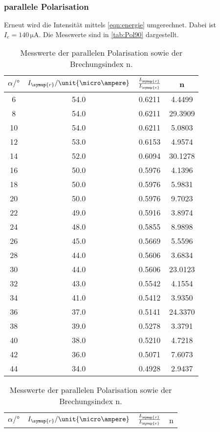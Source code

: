 \subsubsection{parallele Polarisation}
Erneut wird die Intensität mittels \autoref{eqn:energie} umgerechnet. Dabei ist $I_e = 140 \, \unit{\micro\ampere}$. Die Messwerte sind in 
\autoref{tab:Pol90} dargestellt.
\begin{table}
    \centering
    \caption{Messwerte der parallelen Polarisation sowie der Brechungsindex n.}
    \begin{tabular}{c c c c}
        \toprule
        $\alpha \mathrm{/} \unit{\degree}$  & $I_{\symup{r}}\mathrm{/}\unit{\micro\ampere}$ & $\frac{I_{\symup{r}}}{I_{\symup{e}}}$ & n\\
        \midrule
        6&54.0&0.6211&4.4499 \\
        8&54.0&0.6211&29.3909 \\
        10&54.0&0.6211&5.0803 \\
        12&53.0&0.6153&4.9574 \\
       14&52.0&0.6094&30.1278 \\
        16&50.0&0.5976&4.1396 \\
        18&50.0&0.5976&5.9831 \\
        20&50.0&0.5976&9.7023 \\
        22&49.0&0.5916&3.8974 \\
        24&48.0&0.5855&8.9898 \\
        26&45.0&0.5669&5.5596 \\
        28&44.0&0.5606&3.6834 \\
       30&44.0&0.5606&23.0123 \\
        32&43.0&0.5542&4.1554 \\
        34&41.0&0.5412&3.9350 \\
       36&37.0&0.5141&24.3370 \\
        38&39.0&0.5278&3.3791 \\
        40&38.0&0.5210&4.7218 \\
        42&36.0&0.5071&7.6073 \\
        44&34.0&0.4928&2.9437 \\
       \bottomrule
    \end{tabular}
    \quad
    \begin{tabular}{c c c c}
        \toprule
        $\alpha \mathrm{/} \unit{\degree}$  & $I_{\symup{r}}\mathrm{/}\unit{\micro\ampere}$ & $\frac{I_{\symup{r}}}{I_{\symup{e}}}$ & n\\

\end{tabular}
\end{table}
